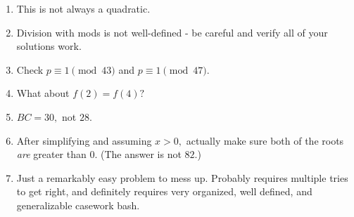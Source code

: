 \documentclass{article}
\begin{document}
\begin{enumerate}
    \item This is not always a quadratic.
    
    \item Division with mods is not well-defined - be careful and verify all of your solutions work.
    
    \item Check $p\equiv 1\pmod{43}$ and $p\equiv 1\pmod{47}.$
    
    \item What about $f(2)=f(4)?$
    
    \item $BC=30,$ not $28.$
    
    \item After simplifying and assuming $x>0,$ actually make sure both of the roots \textit{are} greater than $0.$ (The answer is not $82.$)
    
    \item Just a remarkably easy problem to mess up. Probably requires multiple tries to get right, and definitely requires very organized, well defined, and generalizable casework bash.
    
\end{enumerate}
\end{document}
